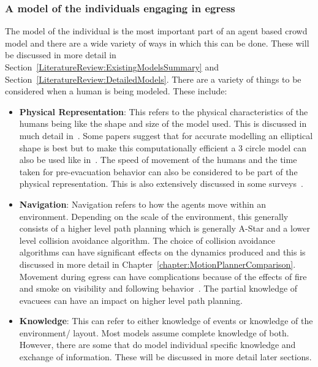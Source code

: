 \subsubsection{A model of the individuals engaging in egress}

The model of the individual is the most important part of an agent based crowd model and there are a wide variety of ways in which this can be done. These will be discussed in more detail in Section~\ref{LiteratureReview:ExistingModelsSummary} and Section~\ref{LiteratureReview:DetailedModels}. There are a variety of things to be considered when a human is being modeled. These include:

\begin{itemize}
\item \textbf{Physical Representation}: This refers to the physical characteristics of the humans being like the shape and size of the model used. This is discussed in much detail in~\cite{Langston:2006kw,Still:2000tp}. Some papers suggest that for accurate modelling an elliptical shape is best but to make this computationally efficient a 3 circle model can also be used like in~\cite{Thompson:1995tm,Langston:2006kw}. The speed of movement of the humans and the time taken for pre-evacuation behavior can also be considered to be part of the physical representation. This is also extensively discussed in some surveys~\cite{Fahy:2010to,Proulx:1995wq}.

\item \textbf{Navigation}: Navigation refers to how the agents move within an environment. Depending on the scale of the environment, this generally consists of a higher level path planning which is generally A-Star and a lower level collision avoidance algorithm. The choice of collision avoidance algorithms can have significant effects on the dynamics produced and this is discussed in more detail in Chapter~\ref{chapter:MotionPlannerComparison}. Movement during egress can have complications because of the effects of fire and smoke on visibility and following behavior~\cite{Kobes:2009jx,Isobe:2003ep,Nagai:2004kl}. The partial knowledge of evacuees can have an impact on higher level path planning.

\item \textbf{Knowledge}: This can refer to either knowledge of events or knowledge of the environment/ layout. Most models assume complete knowledge of both. However, there are some that do model individual specific knowledge and exchange of information. These will be discussed in more detail later sections.


\end{itemize}
